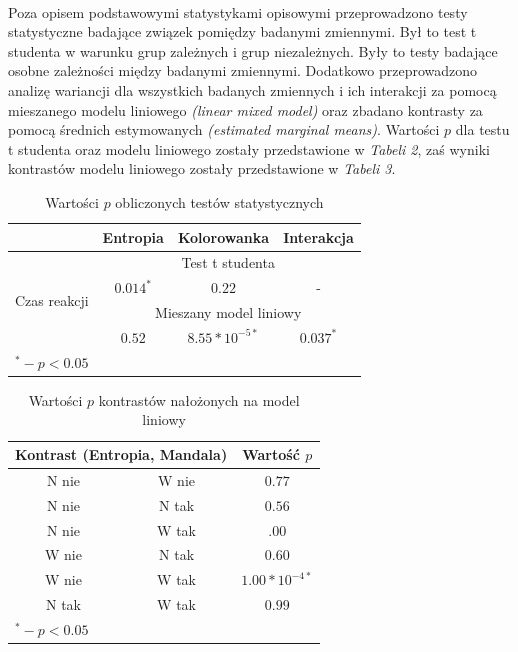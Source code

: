 \documentclass[12pt,a4paper,final,oneside,onecolumn,titlepage]{article}
\begin{document}
\paragraph{}
Poza opisem podstawowymi statystykami opisowymi przeprowadzono testy statystyczne badające związek pomiędzy badanymi zmiennymi. Był to test t studenta w warunku grup zależnych i grup niezależnych. Były to testy badające osobne zależności między badanymi zmiennymi. Dodatkowo przeprowadzono analizę wariancji dla wszystkich badanych zmiennych i ich interakcji za pomocą mieszanego modelu liniowego \textit{(linear mixed model)} oraz zbadano kontrasty za pomocą średnich estymowanych \textit{(estimated marginal means)}. Wartości $p$ dla testu t studenta oraz modelu liniowego zostały przedstawione w \textit{Tabeli 2}, zaś wyniki kontrastów modelu liniowego zostały przedstawione w \textit{Tabeli 3}.
\begin{table}[H]
\caption{Wartości $p$ obliczonych testów statystycznych}
\centering
\begin{tabular}{l c c c}
\hline\hline
 & Entropia & Kolorowanka & Interakcja \\ [0.5ex]
\hline
\multirow{4}{*}{Czas reakcji}& \multicolumn{3}{c}{Test t studenta} \\
 &$0.014^*$&$0.22$&- \\ [3ex]
 & \multicolumn{3}{c}{Mieszany model liniowy}\\
 &$0.52$&$8.55*10^{-5*}$&$0.037^*$ \\
\hline
\multicolumn{4}{l}{\footnotesize{$^{*} - p<0.05$}}
\end{tabular}
\label{Tabela}
\end{table}
\begin{table}[H]
\caption{Wartości $p$ kontrastów nałożonych na model liniowy}
\centering
\begin{tabular}{c c c}
\hline\hline
\multicolumn{2}{c}{Kontrast (Entropia, Mandala)} & Wartość $p$ \\ [0.5ex]
\hline
N nie & W nie & $0.77$ \\
N nie & N tak & $0.56$ \\
N nie & W tak & $.00$ \\
W nie & N tak & $0.60$ \\
W nie & W tak & $1.00*10^{-4*}$ \\
N tak & W tak & $0.99$ \\
\hline
\multicolumn{3}{l}{\footnotesize{$^{*} - p<0.05$}}
\end{tabular}
\label{Tabela}
\end{table}
\end{document}
